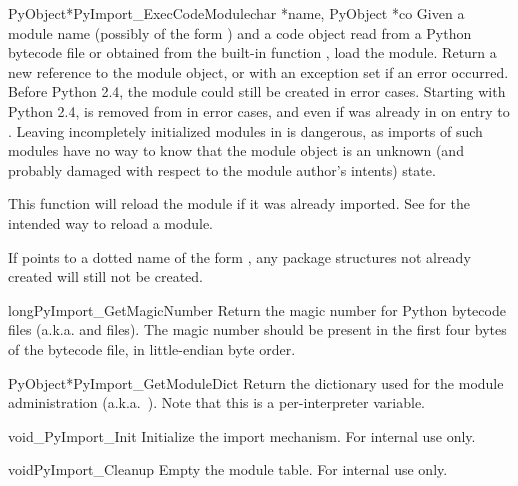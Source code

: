 \begin{cfuncdesc}{PyObject*}{PyImport_ExecCodeModule}{char *name, PyObject *co}
  Given a module name (possibly of the form ) and
  a code object read from a Python bytecode file or obtained from the
  built-in function , load
  the module.  Return a new reference to the module object, or \NULL{}
  with an exception set if an error occurred.  Before Python 2.4, the module
  could still be created in error cases.  Starting with Python 2.4,
   is removed from  in error cases, and even
  if  was already in  on entry to
  .  Leaving incompletely initialized
  modules in  is dangerous, as imports of such modules
  have no way to know that the module object is an unknown (and probably
  damaged with respect to the module author's intents) state.

  This function will reload the module if it was already imported.  See
   for the intended way to reload a
  module.

  If  points to a dotted name of the
  form , any package structures not already
  created will still not be created.


\end{cfuncdesc}

\begin{cfuncdesc}{long}{PyImport_GetMagicNumber}{}
  Return the magic number for Python bytecode files
  (a.k.a.  and  files).  The magic number should
  be present in the first four bytes of the bytecode file, in
  little-endian byte order.
\end{cfuncdesc}

\begin{cfuncdesc}{PyObject*}{PyImport_GetModuleDict}{}
  Return the dictionary used for the module administration
  (a.k.a.\ ).  Note that this is a per-interpreter
  variable.
\end{cfuncdesc}

\begin{cfuncdesc}{void}{_PyImport_Init}{}
  Initialize the import mechanism.  For internal use only.
\end{cfuncdesc}

\begin{cfuncdesc}{void}{PyImport_Cleanup}{}
  Empty the module table.  For internal use only.
\end{cfuncdesc}

